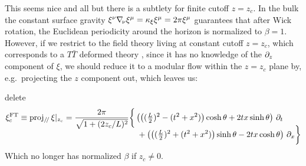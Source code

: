 \documentclass[11pt,a4paper,utf8]{article}
\newcommand{\TTbar}{\ensuremath{T\bar{T}}\xspace}
\begin{document}
	

	
	This seems nice and all but there is a subtlety for finite cutoff $z = z_c$. 
	In the bulk the constant surface gravity $
		\xi^\nu \nabla_{\!\mathnormal{\nu}} \xi^\mu
		= \kappa_\xi \xi^\mu
		= 2\pi \xi^\mu
	$ guarantees that after Wick rotation, the Euclidean periodicity around the horizon is normalized to $\beta = 1$. However, if we restrict to the field theory living at constant cutoff $z = z_c$, which corresponds to a \TTbar deformed theory \cite{McGough:2016lol,Lewkowycz:2019xse} , since it has no knowledge of the $\partial_{z}$ component of $\xi$, we should reduce it to a modular flow within the $z = z_c$ plane by, e.g.~projecting the $z$ component out, which leaves us:
	
	{\color{red} delete
	\begin{equation}
	\begin{aligned}
		\xi^{\mathrm{FT}}_c
		\equiv \operatorname{proj_{\mathit{\text{/\!/}}}} \xi|_{z_c}
		= \frac{2\pi}{
				\sqrt{1 + (2z_c/L)^2}
			}
		& \bigg\{
			\left(
				\left(
					(\tfrac{L}{2})^2
					- (t^2 + x^2)
				\right) \cosh\theta
				+ 2tx \sinh\theta
			\right) \,\partial_{t}
		\\[-2ex] &\quad 
			+ \left(
				\left(
					(\tfrac{L}{2})^2
					+ (t^2 + x^2)
				\right) \sinh\theta
				- 2tx \cosh\theta
			\right) \,\partial_{x}
		\bigg\}
	\end{aligned}
	\end{equation}
	Which no longer has normalized $\beta$ if $z_c \ne 0$.
}
	
\end{document}
